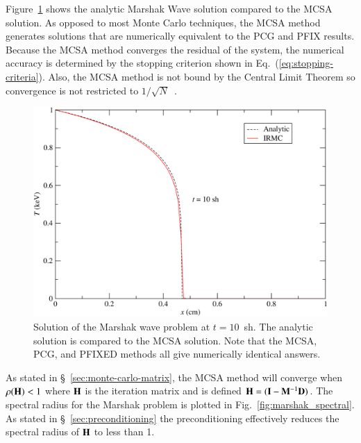 \documentclass[preprint,12pt]{elsarticle}
\newcommand{\vI}{\ensuremath{\ve{I}}}
\begin{document}
Figure~\ref{fig:marshak_10} shows the analytic Marshak Wave solution
compared to the MCSA solution.  As opposed to most Monte Carlo
techniques, the MCSA method generates solutions that are numerically
equivalent to the PCG and PFIX results.  Because the MCSA method
converges the residual of the system, the numerical accuracy is
determined by the stopping criterion shown in
Eq.~(\ref{eq:stopping-criteria}).  Also, the MCSA method is not bound
by the Central Limit Theorem so convergence is not restricted to
$1/\sqrt{N}$~\cite{halton_1994,evans_2003}.

\begin{figure}[htpb!]
  \centerline{
    \includegraphics[width=5in,clip]{marshak_10.pdf}}
  \caption{
    Solution of the Marshak wave problem at $t=10$~sh.  The analytic
    solution is compared to the MCSA solution.  Note that the MCSA,
    PCG, and PFIXED methods all give numerically identical answers.}
  \label{fig:marshak_10}
\end{figure}

As stated in \S~\ref{sec:monte-carlo-matrix}, the MCSA method will
converge when $\rho(\mathbf{H})< 1$ where $\mathbf{H}$ is the iteration matrix
and is defined $\ve{H} = (\vI - \ve{M}^{-1}\ve{D})$.  The spectral
radius for the Marshak problem is plotted in
Fig.~\ref{fig:marshak_spectral}.  As stated in
\S~\ref{sec:preconditioning} the preconditioning effectively reduces
the spectral radius of $\mathbf{H}$ to less than 1.
\end{document}
